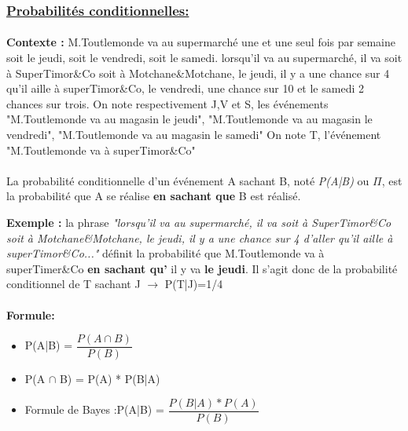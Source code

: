 \documentclass[a4paper]{article}
\begin{document}
\subsubsection{{\underline{Probabilités conditionnelles:}}}

\paragraph{}
\textbf{Contexte :} M.Toutlemonde va au supermarché une et une seul fois par semaine soit le jeudi, soit le vendredi, soit le samedi. lorsqu'il va au supermarché, il va soit à SuperTimor\&Co soit à Motchane\&Motchane, le jeudi, il y a une chance sur 4 qu'il aille à superTimor\&Co, le vendredi, une chance sur 10 et le samedi 2 chances sur trois.
\newline On note respectivement J,V et S, les événements "M.Toutlemonde va au magasin le jeudi", "M.Toutlemonde va au magasin le vendredi", "M.Toutlemonde va au magasin le samedi"
\newline On note T, l'événement "M.Toutlemonde va à superTimor\&Co"

\paragraph{}

\begin{rappel}
La probabilité conditionnelle d'un événement A sachant B, noté \textit{P(A|B)} ou \textit{$\Pi$}, est la probabilité que A se réalise \textbf{en sachant que} B est réalisé.
\end{rappel}

\textbf{Exemple :} la phrase \textit{"lorsqu'il va au supermarché, il va soit à SuperTimor\&Co soit à Motchane\&Motchane, le jeudi, il y a une chance sur 4 d'aller qu'il aille à superTimor\&Co..."} définit la probabilité que M.Toutlemonde va à superTimer\&Co \textbf{en sachant qu'} il y va \textbf{le jeudi}. Il s'agit donc de la probabilité conditionnel de T sachant J $\rightarrow$ P(T|J)=1/4


\paragraph{}
\textbf{Formule:}
\begin{itemize}
\item P(A|B) = $\dfrac{P(A \cap B)}{P(B)}$
\item P(A $\cap$ B) = P(A) * P(B|A)
\item Formule de Bayes :P(A|B) = $\dfrac{P(B|A) * P(A)}{P(B)}$
\end{itemize}
\end{document}
